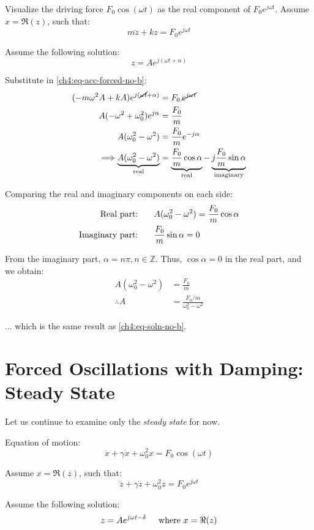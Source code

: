 Visualize the driving force $F_0 \cos(\omega t)$ as the real component of $F_0 e^{j\omega t}$.
Assume $x=\Re(z)$, such that:
\[ m\ddot{z} + kz = F_0 e^{j\omega t}\]

Assume the following solution:
\[z = Ae^{j(\omega t+\alpha)} \]

Substitute in \eqref{ch4:eq-acc-forced-no-b}:
\begin{align*}
	(-m\omega^2 A + kA)e^{j(\cancel{\omega t} + \alpha)} &= F_0 \, \cancel{e^{j\omega t}} \\
	A(-\omega^2 + \omega_0^2)e^{j\alpha} &= \frac{F_0}{m} \\
	A(\omega_0^2 - \omega^2 ) &= \frac{F_0}{m} e^{-j\alpha} \\
	\Longrightarrow
	\underbrace{A(\omega_0^2 - \omega^2 )}_\text{real} &= \underbrace{\frac{F_0}{m} \cos\alpha}_\text{real} - \underbrace{j\frac{F_0}{m} \sin\alpha}_\text{imaginary}
\end{align*}

Comparing the real and imaginary components on each side:
\begin{align*}
	\text{Real part: } \hspace{0.5cm} & A(\omega_0^2 - \omega^2 ) = \frac{F_0}{m} \cos\alpha \\
	\text{Imaginary part: } \hspace{0.5cm} & \frac{F_0}{m} \sin\alpha = 0 
\end{align*}

From the imaginary part, $\alpha = n\pi, n\in\mathbb{Z}$. Thus, $\cos\alpha=0$ in the real part, and we obtain:
\begin{align*}
	A(\omega_0^2 - \omega^2 ) &= \frac{F_0}{m} \\
	\therefore
	A &= \frac{F_0/m}{\omega_0^2 - \omega^2 }
\end{align*}

... which is the same result as \eqref{ch4:eq-soln-no-b}.

\section{Forced Oscillations with Damping: Steady State}

Let us continue to examine only the \emph{steady state} for now.

Equation of motion:
\[ \ddot{x} + \gamma\dot{x} + \omega_0^2 x = F_0 \cos(\omega t) \]

Assume $x=\Re(z)$, such that:
\[ \ddot{z} + \gamma\dot{z} + \omega_0^2 z = F_0 e^{j\omega t} \]

Assume the following solution:
\[ z = Ae^{j\omega t - \delta} \hspace{0.5cm}\text{where } x=\Re(z)\]

